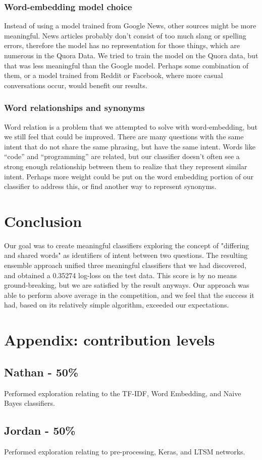 \documentclass{article}
\begin{document}
\subsubsection{Word-embedding model choice}

Instead of using a model trained from Google News, other sources might be more
meaningful. News articles probably don’t consist of too much slang or spelling
errors, therefore the model has no representation for those things, which are
numerous in the Quora Data. We tried to train the model on the Quora data, but
that was less meaningful than the Google model. Perhaps some combination of
them, or a model trained from Reddit or Facebook, where more casual
conversations occur, would benefit our results.

\subsubsection{Word relationships and synonyms}

Word relation is a problem that we attempted to solve with word-embedding, but
we still feel that could be improved. There are many questions with the same
intent that do not share the same phrasing, but have the same intent. Words like
“code” and “programming” are related, but our classifier doesn’t often see a
strong enough relationship between them to realize that they represent similar
intent. Perhaps more weight could be put on the word embedding portion of our
classifier to address this, or find another way to represent synonyms.

\section{Conclusion} \label{headings} Our goal was to create meaningful
classifiers exploring the concept of "differing and shared words" as
identifiers of intent between two questions. The resulting ensemble approach
unified three meaningful classifiers that we had discovered, and obtained a
0.35274 log-loss on the test data. This score is by no means ground-breaking,
but we are satisfied by the result anyways. Our approach was able to perform
above average in the competition, and we feel that the success it had, based on
its relatively simple algorithm, exceeded our expectations.

\section*{Appendix: contribution levels}

\subsection*{Nathan - 50\%}
Performed exploration relating to the TF-IDF, Word Embedding, and Naive Bayes classifiers.

\subsection*{Jordan - 50\%}
Performed exploration relating to pre-processing, Keras, and LTSM networks.
\end{document}
